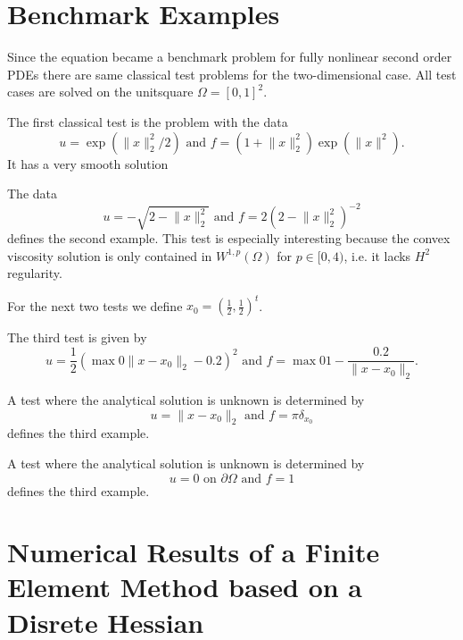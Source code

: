 \section{Benchmark Examples}

Since the \MA equation became a benchmark problem for fully nonlinear second order PDEs there are same classical test problems for the two-dimensional case. All test cases are solved on the unitsquare $\Omega=[0,1]^2$.

\begin{test} \label{test smooth}
The first classical \MA test is the problem with the data
\[
	u=\exp( \lVert x \rVert_2^2  /2) 
	\text { and } 
	f = (1 + \lVert x \rVert_2^2) \exp( \lVert x \rVert^2).
\]
It has a very smooth solution 

\end{test}

\begin{test}\label{test sqrt}
The data
\[
	u = - \sqrt{ 2-  \lVert x \rVert_2^2}
	\text { and } 
	f = 2\left( 2-  \lVert x \rVert_2^2 \right)^{-2}
\]
defines the second example. This test is especially interesting because the convex viscosity solution is only contained in $W^{1,p}(\Omega) $ for $p \in [0,4)$\cite{DG2006a}, i.e. it lacks $H^2$ regularity.
\end{test}

For the next two tests we define $x_0 = \left(\frac 1 2, \frac 1 2  \right)^t$.

\begin{test}\label{test singularity}
The third \MA test is given by
\[
	u=\frac 1 2 \left( \max 0 {\lVert x - x_0 \rVert_2-0.2 }  \right)^2 
	\text { and } 
	f = \max 0 {1-\frac {0.2} {\lVert x - x_0 \rVert_2} }.
\]
\end{test}


\begin{test}\label{test dirac}
A test where the analytical solution is unknown is determined by
\[
	u = \lVert x - x_0 \rVert_2
	\text { and } 
	f = \pi \delta_{x_0}
\]
defines the third example.
\end{test}


\begin{test}\label{test rhsConst}
A test where the analytical solution is unknown is determined by
\[
	u = 0 \text{ on } \partial \Omega
	\text { and } 
	f = 1
\]
defines the third example.
\end{test}


\section{Numerical Results of a Finite Element Method based on a Disrete Hessian}

